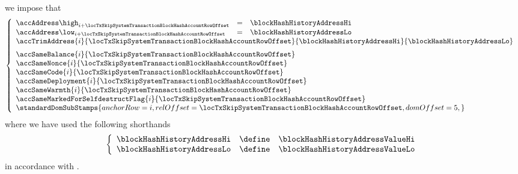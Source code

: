 \item[\underline{Loading the \inst{BLOCKHASH} system smart contract:}] 
	we impose that
	\[
		\left\{ \begin{array}{lclr}
			\accAddress  \high _{i + \locTxSkipSystemTransactionBlockHashAccountRowOffset} & = & \blockHashHistoryAddressHi \\
			\accAddress  \low  _{i + \locTxSkipSystemTransactionBlockHashAccountRowOffset} & = & \blockHashHistoryAddressLo \\
			\multicolumn{4}{l}{
				\accTrimAddress
				{i}{\locTxSkipSystemTransactionBlockHashAccountRowOffset}
				{\blockHashHistoryAddressHi}
				{\blockHashHistoryAddressLo}} \vspace{2mm} \\
			\multicolumn{3}{l}{\accSameBalance                       {i}{\locTxSkipSystemTransactionBlockHashAccountRowOffset}} \\
			\multicolumn{3}{l}{\accSameNonce                         {i}{\locTxSkipSystemTransactionBlockHashAccountRowOffset}} \\
			\multicolumn{3}{l}{\accSameCode                          {i}{\locTxSkipSystemTransactionBlockHashAccountRowOffset}} \\
			\multicolumn{3}{l}{\accSameDeployment                    {i}{\locTxSkipSystemTransactionBlockHashAccountRowOffset}} \\
			\multicolumn{3}{l}{\accSameWarmth                        {i}{\locTxSkipSystemTransactionBlockHashAccountRowOffset}} \\
			\multicolumn{3}{l}{\accSameMarkedForSelfdestructFlag     {i}{\locTxSkipSystemTransactionBlockHashAccountRowOffset}} \\
			\multicolumn{3}{l}{
				\standardDomSubStamps {
					anchorRow = i                                                    ,
					relOffset = \locTxSkipSystemTransactionBlockHashAccountRowOffset ,
					domOffset = 5                                                    ,
				}
			} \\
		\end{array} \right.
	\]
	where we have used the following shorthands
	\[
		\left\{ \begin{array}{lcl}
			\blockHashHistoryAddressHi & \define & \blockHashHistoryAddressValueHi \\
			\blockHashHistoryAddressLo & \define & \blockHashHistoryAddressValueLo \\
		\end{array} \right.
	\]
	in accordance with \cite{EIP-2935}.
